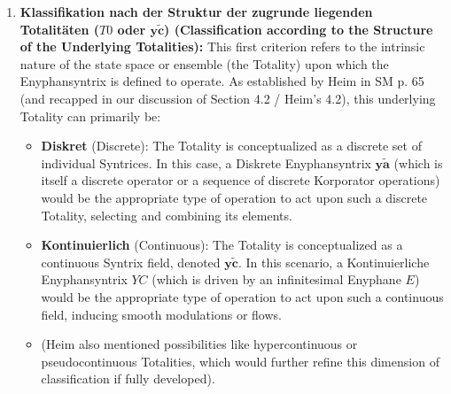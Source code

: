 \documentclass[12pt]{article}
\newcommand{\syntrixtotalitaet}{T0}
\newcommand{\diskreteEnyphansyntrix}{\bm{y\widetilde{a}}}
\newcommand{\kontinuierlicheEnyphansyntrix}{YC}
\newcommand{\enyphane}{E}
\begin{document}
\begin{enumerate}
    \item \textbf{Klassifikation nach der Struktur der zugrunde liegenden Totalitäten (\( \syntrixtotalitaet \) oder \( \mathbf{y\widetilde{c}} \)) (Classification according to the Structure of the Underlying Totalities):}
    This first criterion refers to the intrinsic nature of the state space or ensemble (the Totality) upon which the Enyphansyntrix is defined to operate. As established by Heim in SM p. 65 (and recapped in our discussion of Section 4.2 / Heim's 4.2), this underlying Totality can primarily be:
    \begin{itemize}
        \item \textbf{Diskret} (Discrete): The Totality is conceptualized as a discrete set of individual Syntrices. In this case, a Diskrete Enyphansyntrix \( \diskreteEnyphansyntrix \) (which is itself a discrete operator or a sequence of discrete Korporator operations) would be the appropriate type of operation to act upon such a discrete Totality, selecting and combining its elements.
        \item \textbf{Kontinuierlich} (Continuous): The Totality is conceptualized as a continuous Syntrix field, denoted \( \mathbf{y\widetilde{c}} \). In this scenario, a Kontinuierliche Enyphansyntrix \( \kontinuierlicheEnyphansyntrix \) (which is driven by an infinitesimal Enyphane \( \enyphane \)) would be the appropriate type of operation to act upon such a continuous field, inducing smooth modulations or flows.
        \item (Heim also mentioned possibilities like hypercontinuous or pseudocontinuous Totalities, which would further refine this dimension of classification if fully developed).
    \end{itemize}


\end{enumerate}
\end{document}

